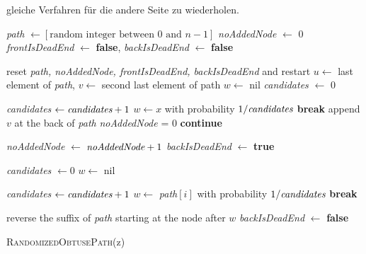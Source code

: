 \documentclass[a4paper, 10pt, ngerman]{article}
\begin{document}
gleiche Verfahren für die andere Seite zu wiederholen.

\begin{algorithm}
    \emph{path} $\gets [\text{random integer between 0 and $n - 1$}]$ \; 
    \emph{noAddedNode} $\gets$ 0 \;
    \emph{frontIsDeadEnd} $\gets$ \textbf{false}, \emph{backIsDeadEnd}  $\gets$ \textbf{false}\;

    {
        {
            reset \emph{path, noAddedNode, frontIsDeadEnd, backIsDeadEnd} and restart \;
        }
        $u \gets$ last element of \emph{path}, $v \gets$ second last element of path \;
        $w \gets$ nil \;
        \emph{candidates} $\gets$ 0 \;

        {
            {
                \emph{candidates} $\gets \emph{candidates} + 1$ \;
                $w \gets x$ with probability $1 / \emph{candidates}$ \;
                {
                    \textbf{break} \;
                }
            }
        }
        {
            append $v$ at the back of \emph{path} \;
            \emph{noAddedNode} = 0 \;
            \textbf{continue} \;
        }

        \emph{noAddedNode} $\gets$ $\emph{noAddedNode} + 1$ \;
        \emph{backIsDeadEnd} $\gets$ \textbf{true} \;

        {
            \emph{candidates} $\gets 0$ \;
            $w \gets$ nil \;

            {
                {
                    \emph{candidates} $\gets \emph{candidates} + 1$ \;
                    $w \gets$ \emph{path}$[i]$ with probability $1 / \emph{candidates}$ \;
                    {
                        \textbf{break} \;
                    }
                }
            }

            {
                reverse the suffix of \emph{path} starting at the node after $w$ \;
                \emph{backIsDeadEnd} $\gets$ \textbf{false} \;
            } 
        } 

    }


    \caption{\textsc{RandomizedObtusePath}(z)}
\end{algorithm}
\end{document}
